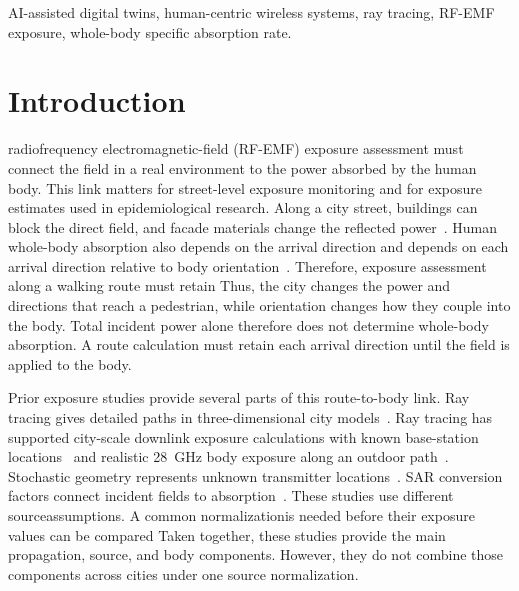 \documentclass{IEEEoj}
\providecommand{\DIFadd}[1]{{\protect\color{blue} \sf #1}} %
\providecommand{\DIFdel}[1]{{\protect\color{red} \scriptsize #1}} %
\providecommand{\DIFaddbegin}{} %
\providecommand{\DIFaddend}{} %
\providecommand{\DIFdelbegin}{} %
\providecommand{\DIFdelend}{} %
\begin{document}
\begin{IEEEkeywords}
AI-assisted digital twins, human-centric wireless systems, ray tracing,
RF-EMF exposure, whole-body specific absorption rate.
\end{IEEEkeywords}

\maketitle

\section{Introduction}\label{sec:introduction}

 radiofrequency electromagnetic-field (RF-EMF)
exposure assessment must connect the field in a real environment to the power
absorbed by the human body. This link matters for street-level exposure
monitoring and for exposure estimates used in epidemiological research. Along
a city street, buildings can block the direct field, and facade materials
change the reflected power~\cite{itu2040,vitucci}. Human whole-body absorption
\DIFdelbegin \DIFdel{also depends on the arrival direction and }\DIFdelend \DIFaddbegin \DIFadd{depends on each arrival direction relative to }\DIFaddend body orientation~\cite{icnirp}.
\DIFdelbegin \DIFdel{Therefore, exposure assessment along a walking route must retain }\DIFdelend \DIFaddbegin \DIFadd{Thus, the city changes the power and directions that reach a pedestrian, while
orientation changes how they couple into the body. Total incident power alone
therefore does not determine whole-body absorption. A route calculation must
retain each arrival }\DIFaddend direction until the field is applied to the body.

Prior exposure studies provide several parts of this \DIFaddbegin \DIFadd{route-to-body }\DIFaddend link. Ray tracing gives
detailed paths in three-dimensional city models~\cite{sionna}. Ray tracing has supported
city-scale downlink exposure calculations with known base-station
locations~\cite{leeman} and realistic 28~GHz body exposure along an outdoor
path~\cite{wydaeghe2026}. Stochastic geometry represents unknown transmitter
locations~\cite{wiame}. SAR conversion factors connect incident fields to
absorption~\cite{varsier}. \DIFdelbegin \DIFdel{These studies use different sourceassumptions. A common normalizationis needed before their exposure values can be compared}\DIFdelend \DIFaddbegin \DIFadd{Taken together, these studies provide the main
propagation, source, and body components. However, they do not combine those
components across cities under one source normalization}\DIFaddend .
\end{document}
